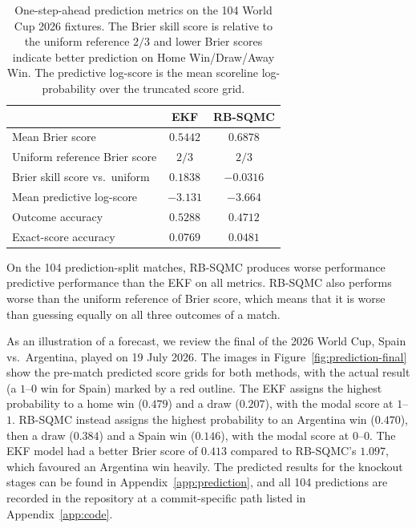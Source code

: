 \begin{table}[H]
\centering
\begin{tabular}{lcc}
\toprule
 & EKF & RB-SQMC \\
\midrule
Mean Brier score & $0.5442$ & $0.6878$ \\
Uniform reference Brier score & $2/3$ & $2/3$ \\
Brier skill score vs.\ uniform & $0.1838$ & $-0.0316$ \\
Mean predictive log-score & $-3.131$ & $-3.664$ \\
Outcome accuracy & $0.5288$ & $0.4712$ \\
Exact-score accuracy & $0.0769$ & $0.0481$ \\
\bottomrule
\end{tabular}
\caption{One-step-ahead prediction metrics on the 104 World Cup 2026 fixtures. The Brier skill score is relative to the uniform reference $2/3$ and lower Brier scores indicate better prediction on Home Win/Draw/Away Win. The predictive log-score is the mean scoreline log-probability over the truncated score grid.}
\label{tab:prediction}
\end{table}

On the 104 prediction-split matches, RB-SQMC produces worse performance predictive performance than the EKF on all metrics. RB-SQMC also performs worse than the uniform reference of Brier score, which means that it is worse than guessing equally on all three outcomes of a match.

As an illustration of a forecast, we review the final of the 2026 World Cup, Spain vs.\ Argentina, played on 19 July 2026. The images in Figure~\ref{fig:prediction-final} show the pre-match predicted score grids for both methods, with the actual result (a $1$--$0$ win for Spain) marked by a red outline. The EKF assigns the highest probability to a home win ($0.479$) and a draw ($0.207$), with the modal score at $1$--$1$. RB-SQMC instead assigns the highest probability to an Argentina win ($0.470$), then a draw ($0.384$) and a Spain win ($0.146$), with the modal score at $0$--$0$. The EKF model had a better Brier score of $0.413$ compared to RB-SQMC's $1.097$, which favoured an Argentina win heavily. The predicted results for the knockout stages can be found in Appendix~\ref{app:prediction}, and all 104 predictions are recorded in the repository at a commit-specific path listed in Appendix~\ref{app:code}.

